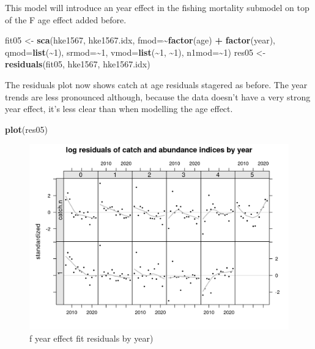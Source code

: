 \documentclass[
]{book}
\newenvironment{Shaded}{\begin{snugshade}}{\end{snugshade}}
\newcommand{\AttributeTok}[1]{\textcolor[rgb]{0.13,0.29,0.53}{#1}}
\newcommand{\DecValTok}[1]{\textcolor[rgb]{0.00,0.00,0.81}{#1}}
\newcommand{\FunctionTok}[1]{\textcolor[rgb]{0.13,0.29,0.53}{\textbf{#1}}}
\newcommand{\NormalTok}[1]{#1}
\newcommand{\OtherTok}[1]{\textcolor[rgb]{0.56,0.35,0.01}{#1}}
\newcommand{\SpecialCharTok}[1]{\textcolor[rgb]{0.81,0.36,0.00}{\textbf{#1}}}
\begin{document}
This model will introduce an year effect in the fishing mortality submodel on top of the F age effect added before.

\begin{Shaded}
\begin{Highlighting}[]
\NormalTok{fit05 }\OtherTok{\textless{}{-}} \FunctionTok{sca}\NormalTok{(hke1567, hke1567.idx, }\AttributeTok{fmod=}\SpecialCharTok{\textasciitilde{}}\FunctionTok{factor}\NormalTok{(age) }\SpecialCharTok{+} \FunctionTok{factor}\NormalTok{(year), }\AttributeTok{qmod=}\FunctionTok{list}\NormalTok{(}\SpecialCharTok{\textasciitilde{}}\DecValTok{1}\NormalTok{), }\AttributeTok{srmod=}\SpecialCharTok{\textasciitilde{}}\DecValTok{1}\NormalTok{, }\AttributeTok{vmod=}\FunctionTok{list}\NormalTok{(}\SpecialCharTok{\textasciitilde{}}\DecValTok{1}\NormalTok{, }\SpecialCharTok{\textasciitilde{}}\DecValTok{1}\NormalTok{),  }\AttributeTok{n1mod=}\SpecialCharTok{\textasciitilde{}}\DecValTok{1}\NormalTok{)}
\NormalTok{res05 }\OtherTok{\textless{}{-}} \FunctionTok{residuals}\NormalTok{(fit05, hke1567, hke1567.idx)}
\end{Highlighting}
\end{Shaded}

The residuals plot now shows catch at age residuals stagered as before. The year trends are less pronounced although, because the data doesn't have a very strong year effect, it's less clear than when modelling the age effect.

\begin{Shaded}
\begin{Highlighting}[]
\FunctionTok{plot}\NormalTok{(res05)}
\end{Highlighting}
\end{Shaded}

\begin{figure}
\centering
\includegraphics{_bookdown_files/_main_files/figure-html/fyearresbyyear-1.png}
\caption{\label{fig:fyearresbyyear}f year effect fit residuals by year)}
\end{figure}
\end{document}
